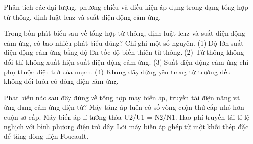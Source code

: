 \begin{bt}
Phân tích các đại lượng, phương chiều và điều kiện áp dụng trong dạng tổng hợp từ thông, định luật lenz và suất điện động cảm ứng.
\end{bt}

\begin{ex}
Trong bốn phát biểu sau về tổng hợp từ thông, định luật lenz và suất điện động cảm ứng, có bao nhiêu phát biểu đúng? Chỉ ghi một số nguyên. (1) Độ lớn suất điện động cảm ứng bằng độ lớn tốc độ biến thiên từ thông. (2) Từ thông không đổi thì không xuất hiện suất điện động cảm ứng. (3) Suất điện động cảm ứng chỉ phụ thuộc điện trở của mạch. (4) Khung dây đứng yên trong từ trường đều không đổi luôn có dòng điện cảm ứng.
\end{ex}

\begin{ex}
Phát biểu nào sau đây đúng về tổng hợp máy biến áp, truyền tải điện năng và ứng dụng cảm ứng điện từ?
\choice
{Máy tăng áp luôn có số vòng cuộn thứ cấp nhỏ hơn cuộn sơ cấp.}
{\True Máy biến áp lí tưởng thỏa U2/U1 = N2/N1.}
{Hao phí truyền tải tỉ lệ nghịch với bình phương điện trở dây.}
{Lõi máy biến áp ghép từ một khối thép đặc để tăng dòng điện Foucault.}
\end{ex}

